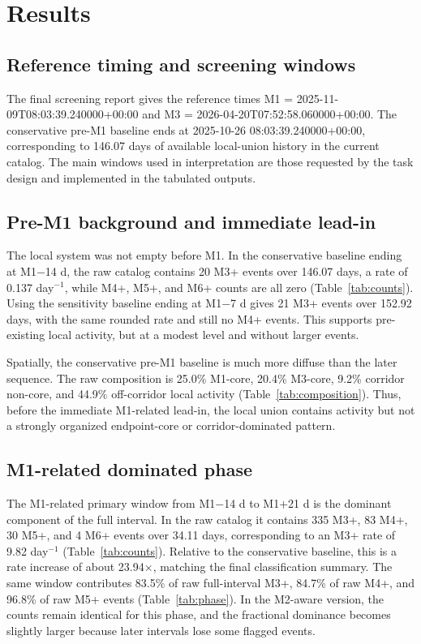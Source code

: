 \documentclass[11pt]{article}
\begin{document}
\section{Results}
\subsection{Reference timing and screening windows}
The final screening report gives the reference times M1 = 2025-11-09T08:03:39.240000+00:00 and M3 = 2026-04-20T07:52:58.060000+00:00. The conservative pre-M1 baseline ends at 2025-10-26 08:03:39.240000+00:00, corresponding to 146.07 days of available local-union history in the current catalog. The main windows used in interpretation are those requested by the task design and implemented in the tabulated outputs.

\subsection{Pre-M1 background and immediate lead-in}
The local system was not empty before M1. In the conservative baseline ending at M1$-$14 d, the raw catalog contains 20 M3+ events over 146.07 days, a rate of 0.137 day$^{-1}$, while M4+, M5+, and M6+ counts are all zero (Table~\ref{tab:counts}). Using the sensitivity baseline ending at M1$-$7 d gives 21 M3+ events over 152.92 days, with the same rounded rate and still no M4+ events. This supports pre-existing local activity, but at a modest level and without larger events.

Spatially, the conservative pre-M1 baseline is much more diffuse than the later sequence. The raw composition is 25.0\% M1-core, 20.4\% M3-core, 9.2\% corridor non-core, and 44.9\% off-corridor local activity (Table~\ref{tab:composition}). Thus, before the immediate M1-related lead-in, the local union contains activity but not a strongly organized endpoint-core or corridor-dominated pattern.

\subsection{M1-related dominated phase}
The M1-related primary window from M1$-$14 d to M1$+$21 d is the dominant component of the full interval. In the raw catalog it contains 335 M3+, 83 M4+, 30 M5+, and 4 M6+ events over 34.11 days, corresponding to an M3+ rate of 9.82 day$^{-1}$ (Table~\ref{tab:counts}). Relative to the conservative baseline, this is a rate increase of about 23.94$\times$, matching the final classification summary. The same window contributes 83.5\% of raw full-interval M3+, 84.7\% of raw M4+, and 96.8\% of raw M5+ events (Table~\ref{tab:phase}). In the M2-aware version, the counts remain identical for this phase, and the fractional dominance becomes slightly larger because later intervals lose some flagged events.
\end{document}
